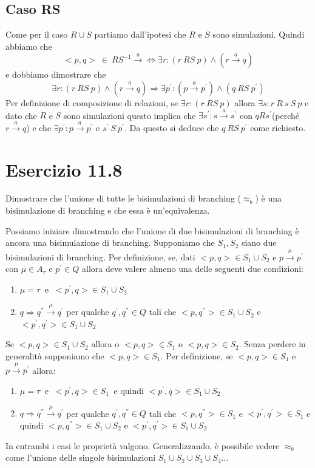 		\subsection{Caso RS}
		
		Come per il caso $R\cup S$ partiamo dall'ipotesi che $R$ e $S$ sono simulazioni. Quindi abbiamo che $$<p,q>\ \in \ RS^{-1} \xrightarrow{a}  \Leftrightarrow \exists r: (r \ RS \ p) \land (r \xrightarrow{a} q)$$
		e dobbiamo dimostrare che
		$$\exists r: (r \ RS \ p) \land (r \xrightarrow{a} q) \Rightarrow \exists p^{'}: (p \xrightarrow{a} p^{'}) \land (q \ RS \ p^{'})$$
		Per definizione di composizione di relazioni, se $\exists r: (r \ RS \ p)$ allora $\exists s: r\ R\ s\ S\ p$ e dato che $R$ e $S$ sono simulazioni questo implica che $\exists s^{'}: s \xrightarrow{a} s^{'}$ con $q R s^{'}$(perché $r \xrightarrow{a}q$) e che $\exists p^{'}: p \xrightarrow{a} p^{'}$ e $s^{'}\ S\ p^{'}$. Da questo si deduce che $q\ RS\ p^{'}$ come richiesto.
			
		\newpage
		
	\section{Esercizio 11.8}
		Dimostrare che l'unione di tutte le bisimulazioni di branching ($\approx_{b}$) è una
		bisimulazione di branching e che essa è un'equivalenza.
		
		\sectionline
		
		Possiamo iniziare dimostrando che l'unione di due bisimulazioni di branching è ancora una bisimulazione di branching. Supponiamo che $S_{1},S_{2}$ siano due bisimulazioni di branching. Per definizione, se, dati $<p,q>\in S_{1}\cup S_{2}$ e $p \xrightarrow{\mu}p^{'}$ con $\mu \in A_{\tau}$ e $p^{'}\in Q$ allora deve valere almeno una delle seguenti due condizioni:
		\begin{enumerate}
			\item $\mu = \tau\ $ e $\ <p^{'},q>\in S_{1}\cup S_{2}$
			\item $q \Rightarrow q^{''}\xrightarrow{\mu}q^{'}$ per qualche $q^{'},q^{''}\in Q$ tali che $<p,q^{''}>\in S_{1}\cup S_{2}$ e $<p^{'},q^{'}>\in S_{1}\cup S_{2}$
		\end{enumerate}
		
		Se $<p,q>\in S_{1}\cup S_{2}$ allora o $<p,q>\in S_{1}$ o $<p,q>\in S_{2}$. Senza perdere in generalità supponiamo che $<p,q>\in S_{1}$. Per definizione, se $<p,q>\in S_{1}$ e $p \xrightarrow{\mu}p^{'}$ allora:
		\begin{enumerate}
			\item $\mu = \tau\ $ e $\ <p^{'},q>\in S_{1}\ $ e quindi $<p^{'},q>\in S_{1}\cup S_{2}$
			\item $q \Rightarrow q^{''}\xrightarrow{\mu}q^{'}$ per qualche $q^{'},q^{''}\in Q$ tali che $<p,q^{''}>\in S_{1}$ e $<p^{'},q^{'}>\in S_{1}$ e quindi $<p,q^{''}>\in S_{1}\cup S_{2}$ e $<p^{'},q^{'}>\in S_{1}\cup S_{2}$
		\end{enumerate} 
		In entrambi i casi le proprietà valgono. Generalizzando, è possibile vedere $\approx_{b}$ come l'unione delle singole bisimulazioni $S_{1}\cup S_{2}\cup S_{3}\cup S_{4}\dots$
		
